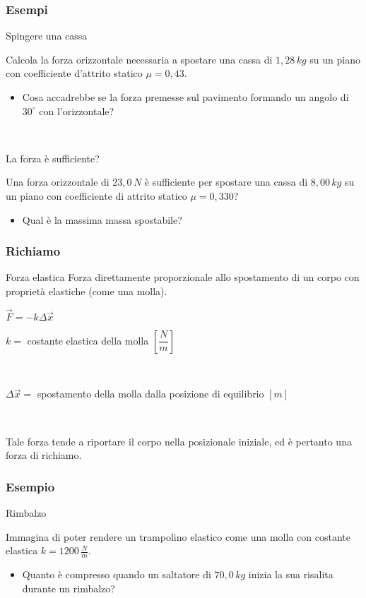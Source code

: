 \documentclass[]{beamer}
\theoremstyle{plain}
\begin{document}
\begin{frame}
\frametitle{Esempi}
\begin{exampleblock}{Spingere una cassa}
\begin{small}
Calcola la forza orizzontale necessaria a spostare una cassa di $ 1,28 \, kg $ su un piano con coefficiente d'attrito statico $ \mu = 0,43 $.
\begin{itemize}
  \item Cosa accadrebbe se la forza premesse sul pavimento formando un angolo di $ 30^\circ $ con l'orizzontale?
\end{itemize}
\end{small}
\end{exampleblock}

~

\begin{exampleblock}{La forza è sufficiente?}
\begin{small}
Una forza orizzontale di $ 23,0 \, N $ è sufficiente per spostare una cassa di $ 8,00 \, kg $ su un piano con coefficiente di attrito statico $ \mu = 0,330 $?
\begin{itemize}
  \item Qual è la massima massa spostabile?
\end{itemize}
\end{small}
\end{exampleblock}
\end{frame}


\begin{frame}
  \frametitle{Richiamo}
\begin{block}{Forza elastica}
Forza direttamente proporzionale allo spostamento di un corpo con proprietà elastiche (come una molla).

\begin{center}
\colorbox{blue!30}{$ \vec{F} = - k \Delta \vec{x} $}
\end{center}
$ k = $ costante elastica della molla $ \left[ \dfrac{N}{m} \right]$

~

$ \Delta \vec{x} = $ spostamento della molla dalla posizione di equilibrio $ [m] $
\end{block}\pause

~

Tale forza tende a riportare il corpo nella posizionale iniziale, ed è pertanto una \alert{forza di richiamo}.
\end{frame}


\begin{frame}
\frametitle{Esempio}
\begin{exampleblock}{Rimbalzo}
{\small Immagina di poter rendere un trampolino elastico come una molla con costante elastica $ k = 1200 \, \frac{N}{m} $.
\begin{itemize}
  \item Quanto è compresso quando un saltatore di $ 70,0 \, kg $ inizia la sua risalita durante un rimbalzo?
\end{itemize}
}
\end{exampleblock}
\end{frame}
\end{document}

